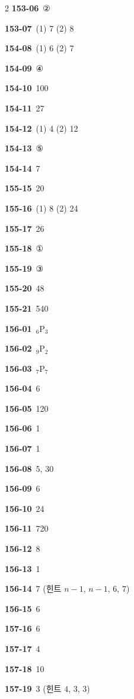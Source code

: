 \documentclass[10pt,a4paper]{article}
\begin{document}
\begin{multicols}{2}
\noindent\textbf{153-06}\ ②\par
\noindent\textbf{153-07}\ (1) 7 (2) 8\par
\noindent\textbf{154-08}\ (1) 6 (2) 7\par
\noindent\textbf{154-09}\ ④\par
\noindent\textbf{154-10}\ 100\par
\noindent\textbf{154-11}\ 27\par
\noindent\textbf{154-12}\ (1) 4 (2) 12\par
\noindent\textbf{154-13}\ ⑤\par
\noindent\textbf{154-14}\ 7\par
\noindent\textbf{155-15}\ 20\par
\noindent\textbf{155-16}\ (1) 8 (2) 24\par
\noindent\textbf{155-17}\ 26\par
\noindent\textbf{155-18}\ ①\par
\noindent\textbf{155-19}\ ③\par
\noindent\textbf{155-20}\ 48\par
\noindent\textbf{155-21}\ 540\par
\noindent\textbf{156-01}\ ${}_6\mathrm{P}_3$\par
\noindent\textbf{156-02}\ ${}_9\mathrm{P}_2$\par
\noindent\textbf{156-03}\ ${}_7\mathrm{P}_7$\par
\noindent\textbf{156-04}\ 6\par
\noindent\textbf{156-05}\ 120\par
\noindent\textbf{156-06}\ 1\par
\noindent\textbf{156-07}\ 1\par
\noindent\textbf{156-08}\ 5, 30\par
\noindent\textbf{156-09}\ 6\par
\noindent\textbf{156-10}\ 24\par
\noindent\textbf{156-11}\ 720\par
\noindent\textbf{156-12}\ 8\par
\noindent\textbf{156-13}\ 1\par
\noindent\textbf{156-14}\ 7 (힌트 $n-1$, $n-1$, $6$, $7$)\par
\noindent\textbf{156-15}\ 6\par
\noindent\textbf{157-16}\ 6\par
\noindent\textbf{157-17}\ 4\par
\noindent\textbf{157-18}\ 10\par
\noindent\textbf{157-19}\ 3 (힌트 $4$, $3$, $3$)\par

\end{multicols}
\end{document}
